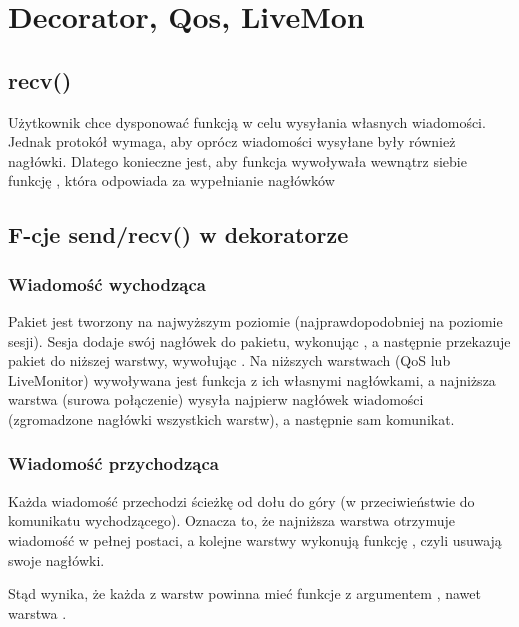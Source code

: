 



	\section{Decorator, Qos, LiveMon}
	
	\subsection{recv()}
	Użytkownik chce dysponować funkcją  w celu wysyłania własnych wiadomości. Jednak protokół wymaga, aby oprócz wiadomości wysyłane były również nagłówki. Dlatego konieczne jest, aby funkcja  wywoływała wewnątrz siebie funkcję , która odpowiada za wypełnianie nagłówków
	
	
	\subsection{F-cje send/recv() w dekoratorze} 
	
	\subsubsection{Wiadomość wychodząca}
	Pakiet jest tworzony na najwyższym poziomie (najprawdopodobniej na poziomie sesji). Sesja dodaje swój nagłówek do pakietu, wykonując , a następnie przekazuje pakiet do niższej warstwy, wywołując . Na niższych warstwach (QoS lub LiveMonitor) wywoływana jest funkcja  z ich własnymi nagłówkami, a najniższa warstwa (surowa połączenie) wysyła najpierw nagłówek wiadomości (zgromadzone nagłówki wszystkich warstw), a następnie sam komunikat.
	
	
	\subsubsection{Wiadomość przychodząca}
	Każda wiadomość przechodzi ścieżkę od dołu do góry (w przeciwieństwie do komunikatu wychodzącego). Oznacza to, że najniższa warstwa otrzymuje wiadomość w pełnej postaci, a kolejne warstwy wykonują funkcję , czyli usuwają swoje nagłówki. 
	
	
	Stąd wynika, że każda z warstw powinna mieć funkcje  z argumentem , nawet warstwa .
	
